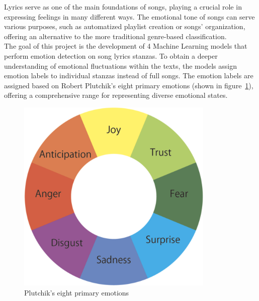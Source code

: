 Lyrics serve as one of the main foundations of songs, playing a crucial role in
expressing feelings in many different ways.
The emotional tone of songs can serve various purposes, such as
automatized playlist creation or songs' organization,
offering an alternative to the more traditional genre-based classification. \\
The goal of this project is the development of 4 Machine Learning models
that perform emotion detection on song lyrics stanzas. To obtain a deeper
understanding of emotional fluctuations within the texts, the models assign
emotion labels to individual stanzas instead of full songs.
The emotion labels are assigned based on Robert Plutchik's eight primary
emotions (shown in figure~\ref{fig:primary_emotions}), offering a comprehensive
range for representing diverse emotional states.\\
\begin{figure}[H]
    \centering
    \includegraphics[scale= 0.30]{pictures/plutchik_primary_emotions.png}
    \caption{Plutchik's eight primary emotions}
    \label{fig:primary_emotions}
\end{figure}

